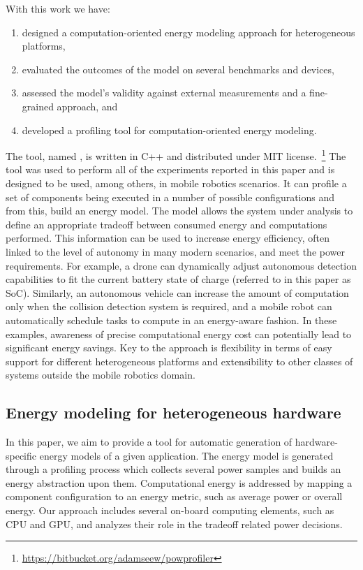 With this work we have: 
\begin{enumerate}
  \item designed a computation-oriented energy modeling approach for heterogeneous platforms,
  \item evaluated the outcomes of the model on several benchmarks and devices,
  \item assessed the model's validity against external measurements and a fine-grained approach, and
  \item developed a profiling tool for computation-oriented energy modeling.
\end{enumerate}
The tool, named \powprof{}, is written in C++ and distributed under MIT license.~\footnote{\label{powprof-url}\url{https://bitbucket.org/adamseew/powprofiler}} The tool was used to perform all of the experiments reported in this paper and is designed to be used, among others, in mobile robotics scenarios. It can profile a set of components being executed in a number of possible configurations and from this, build an energy model. The model allows the system under analysis to define an appropriate tradeoff between consumed energy and computations performed. This information can be used to increase energy efficiency, often linked to the level of autonomy in many modern scenarios, and meet the power requirements. For example, a drone can dynamically adjust autonomous detection capabilities to fit the current battery state of charge (referred to in this paper as SoC). Similarly, an autonomous vehicle can increase the amount of computation only when the collision detection system is required, and a mobile robot can automatically schedule tasks to compute in an energy-aware fashion. In these examples, awareness of precise computational energy cost can potentially lead to significant energy savings. Key to the approach is flexibility in terms of easy support for different heterogeneous platforms and extensibility to other classes of systems outside the mobile robotics domain.

\subsection{\color{cyan}Energy modeling for heterogeneous hardware}

In this paper, we aim to provide a tool for automatic generation of hardware-specific energy models of a given application. The energy model is generated through a profiling process which collects several power samples and builds an energy abstraction upon them. Computational energy is addressed by mapping a component configuration to an energy metric, such as average power or overall energy. Our approach includes several on-board computing elements, such as CPU and GPU, and analyzes their role in the tradeoff related power decisions. 

